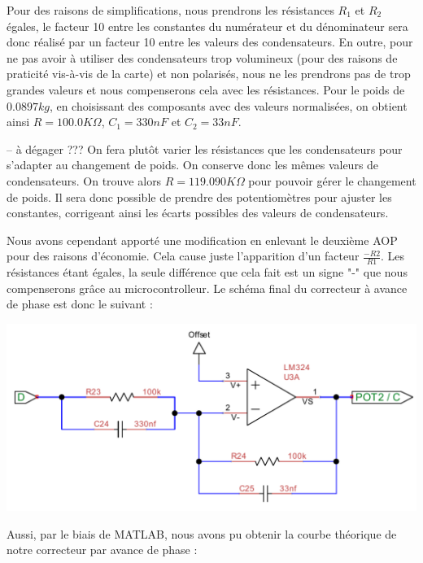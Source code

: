 \documentclass[11pt, french]{article} %
\begin{document}
Pour des raisons de simplifications, nous prendrons les résistances $R_1$ et $R_2$ égales, le facteur 10 entre les constantes du numérateur et du dénominateur sera donc réalisé par un facteur 10 entre les valeurs des condensateurs. En outre, pour ne pas avoir à utiliser des condensateurs trop volumineux (pour des raisons de praticité vis-à-vis de la carte) et non polarisés, nous ne les prendrons pas de trop grandes valeurs et nous compenserons cela avec les résistances. Pour le poids de $0.0897 kg$, en choisissant des composants avec des valeurs normalisées, on obtient ainsi $R=100.0 K\Omega$, $C_1=330 nF$ et $C_2=33 nF$.

\vspace{0.5cm}
-- à dégager ???
On fera plutôt varier les résistances que les condensateurs pour s'adapter au changement de poids. On conserve donc les mêmes valeurs de condensateurs. On trouve alors $R=119.090 K\Omega$ pour pouvoir gérer le changement de poids. Il sera donc possible de prendre des potentiomètres pour ajuster les constantes, corrigeant ainsi les écarts possibles des valeurs de condensateurs. 

\vspace{0.5cm}

Nous avons cependant apporté une modification en enlevant le deuxième AOP pour des raisons d'économie. Cela cause juste l'apparition d'un facteur $\frac{-R2}{R1}$. Les résistances étant égales, la seule différence que cela fait est un signe "-" que nous compenserons grâce au microcontrolleur. Le schéma final du correcteur à avance de phase est donc le suivant :

\begin{center}
\includegraphics[scale = 0.8]{SolutionAnalogique/AvPhase.pdf}
\end{center}

Aussi, par le biais de MATLAB, nous avons pu obtenir la courbe théorique de notre correcteur par avance de phase :
\end{document}
